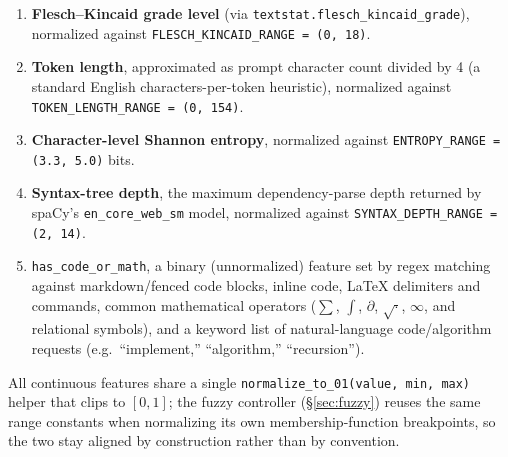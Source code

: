 \documentclass[conference]{IEEEtran}
\begin{document}
\begin{enumerate}
  \item \textbf{Flesch--Kincaid grade level} (via
    \texttt{textstat.flesch\_kincaid\_grade}), normalized against
    \texttt{FLESCH\_KINCAID\_RANGE = (0, 18)}.
  \item \textbf{Token length}, approximated as prompt character count
    divided by 4 (a standard English characters-per-token heuristic),
    normalized against \texttt{TOKEN\_LENGTH\_RANGE = (0, 154)}.
  \item \textbf{Character-level Shannon entropy}, normalized against
    \texttt{ENTROPY\_RANGE = (3.3, 5.0)} bits.
  \item \textbf{Syntax-tree depth}, the maximum dependency-parse depth
    returned by spaCy's \texttt{en\_core\_web\_sm} model, normalized
    against \texttt{SYNTAX\_DEPTH\_RANGE = (2, 14)}.
  \item \texttt{has\_code\_or\_math}, a binary (unnormalized) feature set
    by regex matching against markdown/fenced code blocks, inline code,
    LaTeX delimiters and commands, common mathematical operators
    ($\sum$, $\int$, $\partial$, $\sqrt{\cdot}$, $\infty$, and relational
    symbols), and a keyword list of natural-language code/algorithm
    requests (e.g.\ ``implement,'' ``algorithm,'' ``recursion'').
\end{enumerate}

All continuous features share a single \texttt{normalize\_to\_01(value,
min, max)} helper that clips to $[0,1]$; the fuzzy controller
(\S\ref{sec:fuzzy}) reuses the same range constants when normalizing its
own membership-function breakpoints, so the two stay aligned by
construction rather than by convention.
\end{document}
